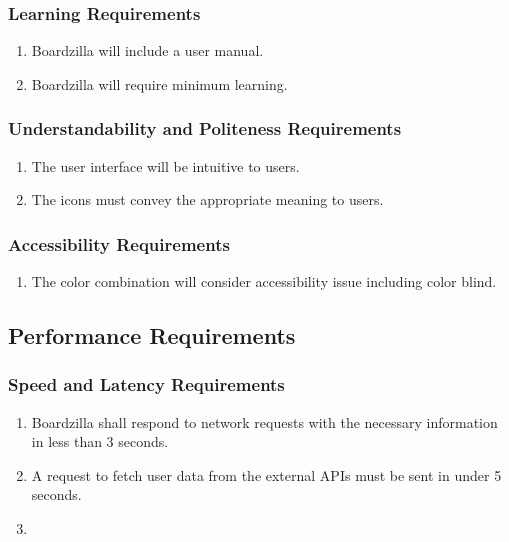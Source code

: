 \documentclass[]{article}
\begin{document}
\subsubsection{Learning Requirements}
\label{ssub:learning_requirements}
\begin{enumerate}[{UH}1. ]
  \item Boardzilla will include a user manual.
  \item Boardzilla will require minimum learning.
\end{enumerate}

\subsubsection{Understandability and Politeness Requirements}
\label{ssub:understandability_and_politeness_requirements}
\begin{enumerate}[{UH}1. ]
  \item The user interface will be intuitive to users.
  \item The icons must convey the appropriate meaning to users.
\end{enumerate}

\subsubsection{Accessibility Requirements}
\label{ssub:accessibility_requirements}
\begin{enumerate}[{UH}1. ]
  \item The color combination will consider accessibility issue including color blind.
\end{enumerate}


\subsection{Performance Requirements}
\label{sub:performance_requirements}

\subsubsection{Speed and Latency Requirements}
\label{ssub:speed_and_latency_requirements}
\begin{enumerate}[{PR}1. ]
  \item Boardzilla shall respond to network requests with the necessary information in less than 3 seconds.
  \item A request to fetch user data from the external APIs must be sent in under 5 seconds.
  \item 
\end{enumerate}
\end{document}
